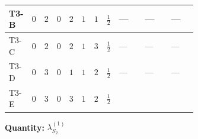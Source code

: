 \documentclass[8pt]{article}
\begin{document}
\begin{landscape}
\begin{longtable}{@{}llcccccc >{\raggedright\arraybackslash}p{0.21\linewidth} >{\raggedright\arraybackslash}p{0.21\linewidth} >{\raggedright\arraybackslash}p{0.21\linewidth}@{}}
\midrule
T3-B & $0$ & $2$ & $0$ & $2$ & $1$ & $1$ & $\frac{1}{2}$ & --- & --- & --- \\
\midrule
T3-C & $0$ & $2$ & $0$ & $2$ & $1$ & $3$ & $\frac{1}{2}$ & --- & --- & --- \\
\midrule
T3-D & $0$ & $3$ & $0$ & $1$ & $1$ & $2$ & $\frac{1}{2}$ & --- & --- & --- \\
\midrule
T3-E & $0$ & $3$ & $0$ & $3$ & $1$ & $2$ & $\frac{1}{2}$ & \scriptsize\adjustbox{max width=\linewidth}{$\begin{gathered} 21 {g_2}^4\end{gathered}$} & \scriptsize\adjustbox{max width=\linewidth}{$\begin{gathered} +{g_1}^2 \left(12 {g_2}^2-12 {\lambda_{S_2}^{(1)}}-6 {\lambda_{S_2}^{(A)}}\right)\end{gathered}$} & \scriptsize\adjustbox{max width=\linewidth}{$\begin{gathered} +{g_2}^2 (-24 {\lambda_{S_2}^{(1)}}-12 {\lambda_{S_2}^{(A)}})\end{gathered}$} \\
\midrule
\bottomrule
\end{longtable}
\clearpage
\noindent\textbf{Quantity: }$\lambda_{S_2}^{(1)}$\par\smallskip

\end{landscape}
\end{document}
